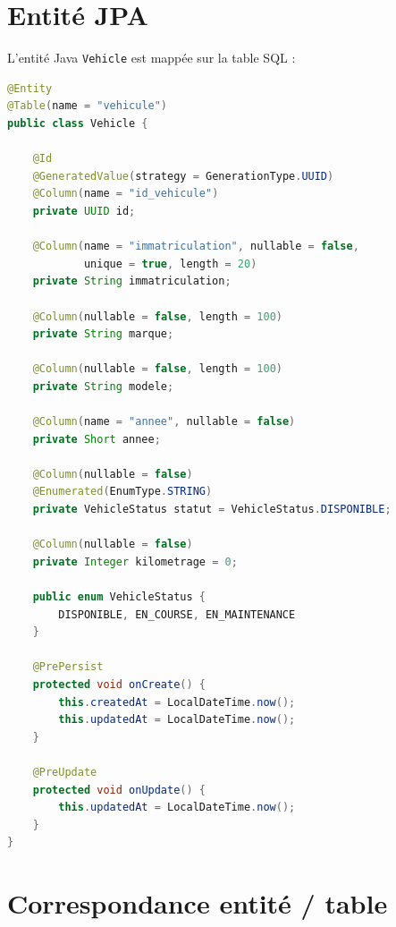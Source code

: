 \documentclass[12pt,a4paper]{report}
\begin{document}
\section{Entit\'e JPA}

L'entit\'e Java \texttt{Vehicle} est mapp\'ee sur la table SQL :

\begin{lstlisting}[style=javastyle, language=Java, caption={Extrait de Vehicle.java}]
@Entity
@Table(name = "vehicule")
public class Vehicle {

    @Id
    @GeneratedValue(strategy = GenerationType.UUID)
    @Column(name = "id_vehicule")
    private UUID id;

    @Column(name = "immatriculation", nullable = false,
            unique = true, length = 20)
    private String immatriculation;

    @Column(nullable = false, length = 100)
    private String marque;

    @Column(nullable = false, length = 100)
    private String modele;

    @Column(name = "annee", nullable = false)
    private Short annee;

    @Column(nullable = false)
    @Enumerated(EnumType.STRING)
    private VehicleStatus statut = VehicleStatus.DISPONIBLE;

    @Column(nullable = false)
    private Integer kilometrage = 0;

    public enum VehicleStatus {
        DISPONIBLE, EN_COURSE, EN_MAINTENANCE
    }

    @PrePersist
    protected void onCreate() {
        this.createdAt = LocalDateTime.now();
        this.updatedAt = LocalDateTime.now();
    }

    @PreUpdate
    protected void onUpdate() {
        this.updatedAt = LocalDateTime.now();
    }
}
\end{lstlisting}

\section{Correspondance entit\'e / table}
\end{document}
